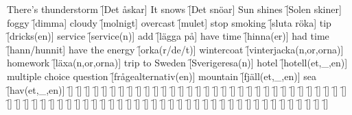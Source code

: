 \begin{questions}
\begin{multicols}{2}
        \question There's thunderstorm \f[Det åskar]
        \question It snows \f[Det snöar]
        \question Sun shines \f[Solen skiner]
        \question foggy \f[dimma]
        \question cloudy \f[molnigt]
        \question overcast \f[mulet]
        \question stop smoking \f[sluta röka]
        \question tip \f[dricks(en)]
        \question service \f[service(n)]
        \question add \f[lägga på]
        \question have time \f[hinna(er)]
        \question had time \f[hann/hunnit]
        \question have the energy \f[orka(r/de/t)]
        \question wintercoat \f[vinterjacka(n,or,orna)]
        \question homework \f[läxa(n,or,orna)]
        \question trip to Sweden \f[Sverigeresa(n)]
        \question hotel \f[hotell(et,\_,en)]
        \question multiple choice question \f[frågealternativ(en)]
        \question mountain \f[fjäll(et,\_,en)]
        \question sea \f[hav(et,\_,en)]
        \question  \f[]
        \question  \f[]
        \question  \f[]
        \question  \f[]
        \question  \f[]
        \question  \f[]
        \question  \f[]
        \question  \f[]
        \question  \f[]
        \question  \f[]
        \question  \f[]
        \question  \f[]
        \question  \f[]
        \question  \f[]
        \question  \f[]
        \question  \f[]
        \question  \f[]
        \question  \f[]
        \question  \f[]
        \question  \f[]
        \question  \f[]
        \question  \f[]
        \question  \f[]
        \question  \f[]
        \question  \f[]
        \question  \f[]
        \question  \f[]
        \question  \f[]
        \question  \f[]
        \question  \f[]
        \question  \f[]
        \question  \f[]
        \question  \f[]
        \question  \f[]
        \question  \f[]
        \question  \f[]
        \question  \f[]
        \question  \f[]
        \question  \f[]
        \question  \f[]
        \question  \f[]
        \question  \f[]
        \question  \f[]
        \question  \f[]
        \question  \f[]
        \question  \f[]
        \question  \f[]
        \question  \f[]
        \question  \f[]
        \question  \f[]
        \question  \f[]
        \question  \f[]
        \question  \f[]
        \question  \f[]
        \question  \f[]
        \question  \f[]
        \question  \f[]
        \question  \f[]
        \question  \f[]
        \question  \f[]
        \question  \f[]
        \question  \f[]
        \question  \f[]
        \question  \f[]
        \question  \f[]
        \question  \f[]
        \question  \f[]
        \question  \f[]
        \question  \f[]
        \question  \f[]
        \question  \f[]

\end{multicols}
\end{questions}
